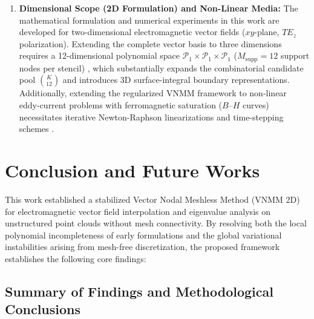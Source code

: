 \documentclass[preprint,12pt]{elsarticle}
\begin{document}
\begin{enumerate}
    \item \textbf{Dimensional Scope (2D Formulation) and Non-Linear Media:} 
    The mathematical formulation and numerical experiments in this work are developed for two-dimensional electromagnetic vector fields ($xy$-plane, $TE_z$ polarization). Extending the complete vector basis to three dimensions requires a 12-dimensional polynomial space $\mathcal{P}_1 \times \mathcal{P}_1 \times \mathcal{P}_1$ ($M_{\mathrm{supp}} = 12$ support nodes per stencil) \cite{goncalves2023vector}, which substantially expands the combinatorial candidate pool $\binom{K}{12}$ and introduces 3D surface-integral boundary representations. Additionally, extending the regularized VNMM framework to non-linear eddy-current problems with ferromagnetic saturation ($B\text{--}H$ curves) necessitates iterative Newton-Raphson linearizations and time-stepping schemes \cite{tsukerman1992overlapping, coppoli2012induction}.
\end{enumerate}

\section{Conclusion and Future Works}
\label{sec:conclusion}

This work established a stabilized Vector Nodal Meshless Method (VNMM 2D) for electromagnetic vector field interpolation and eigenvalue analysis on unstructured point clouds without mesh connectivity. By resolving both the local polynomial incompleteness of early formulations and the global variational instabilities arising from mesh-free discretization, the proposed framework establishes the following core findings:

\subsection{Summary of Findings and Methodological Conclusions}
\label{subsec:summary_conclusions}
\end{document}
